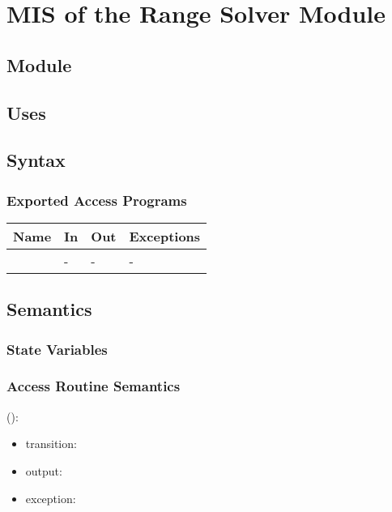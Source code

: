 \documentclass[12pt, titlepage]{article}
\begin{document}
\section{MIS of the Range Solver Module} 
\label{Module_rangesolver}

\subsection{Module}


\subsection{Uses}


\subsection{Syntax}

\subsubsection{Exported Access Programs}

\begin{center}
	\begin{tabular}{p{3cm} p{4cm} p{4cm} p{2cm}}
		\hline
		\textbf{Name} & \textbf{In} & \textbf{Out} & \textbf{Exceptions} \\
		\hline
		\wss{accessProg} & - & - & - \\
		\hline
	\end{tabular}
\end{center}

\subsection{Semantics}

\subsubsection{State Variables}


\subsubsection{Access Routine Semantics}

\noindent {}():
\begin{itemize}
	\item transition:  
	\item output:  
	\item exception:  
\end{itemize}
\end{document}
